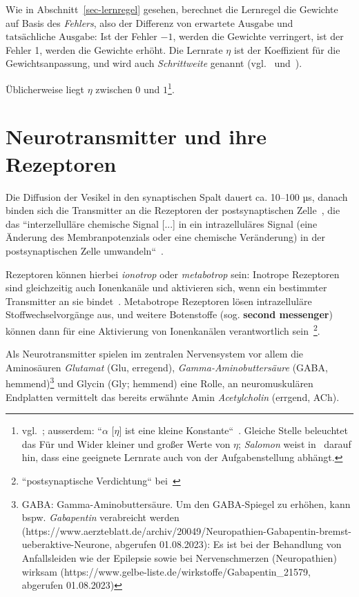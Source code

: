 Wie in Abschnitt~\ref{sec-lernregel} gesehen, berechnet die Lernregel die Gewichte auf Basis des \textit{Fehlers}, also der Differenz von $\text{erwartete Ausgabe}$ und $\text{tatsächliche Ausgabe}$: Ist der Fehler $-1$, werden die Gewichte verringert, ist der Fehler 1, werden die Gewichte erhöht.
Die Lernrate $\eta$ ist der Koeffizient für die Gewichtsanpassung, und wird auch \textit{Schrittweite} genannt (vgl.~\cite[93]{GBC18} und~\cite[172]{RN09}).

Üblicherweise liegt $\eta$ zwischen $0$ und $1$\footnote{
    vgl.~\cite[61]{Fau94}; ausserdem: ``$\alpha$ [$\eta$] ist eine kleine Konstante``~\cite[172]{RN09}. Gleiche Stelle beleuchtet das Für und Wider kleiner und großer Werte von $\eta$; \textit{Salomon} weist in~\cite[173]{Sal90} darauf hin, dass eine geeignete Lernrate auch von der Aufgabenstellung abhängt.
}.



\section{Neurotransmitter und ihre Rezeptoren}

Die Diffusion der Vesikel in den synaptischen Spalt dauert ca. 10–100 µs, danach binden sich die Transmitter an die Rezeptoren der postsynaptischen Zelle~\cite[96]{HS19a}, die das ``interzellulläre chemische Signal [...] in ein intrazelluläres Signal (eine Änderung des Membranpotenzials oder eine chemische Veränderung) in der postsynaptischen Zelle umwandeln``~\cite[123]{BCP18}.

Rezeptoren können hierbei \textit{ionotrop} oder \textit{metabotrop} sein: Inotrope Rezeptoren sind gleichzeitig auch Ionenkanäle und aktivieren sich, wenn ein bestimmter Transmitter an sie bindet~\cite[109]{HS19b}.
Metabotrope Rezeptoren lösen intrazelluläre Stoffwechselvorgänge aus, und weitere Botenstoffe (sog. \textbf{second messenger}) können dann für eine Aktivierung von Ionenkanälen verantwortlich sein~\cite[134]{RK18}\footnote{
    ``postsynaptische Verdichtung`` bei~\cite[123]{BCP18}
}.

Als Neurotransmitter spielen im zentralen Nervensystem vor allem  die Aminosäuren \textit{Glutamat} (Glu, erregend), \textit{Gamma-Aminobuttersäure} (GABA, hemmend)\footnote{
    GABA: Gamma-Aminobuttersäure. Um den GABA-Spiegel zu erhöhen, kann bspw. \textit{Gabapentin} verabreicht werden (https://www.aerzteblatt.de/archiv/20049/Neuropathien-Gabapentin-bremst-ueberaktive-Neurone, abgerufen 01.08.2023): Es ist bei der Behandlung von Anfallsleiden wie der Epilepsie sowie bei Nervenschmerzen (Neuropathien) wirksam (https://www.gelbe-liste.de/wirkstoffe/Gabapentin_21579, abgerufen 01.08.2023)
} und Glycin (Gly; hemmend) eine Rolle, an neuromuskulären Endplatten vermittelt das bereits erwähnte Amin \textit{Acetylcholin} (errgend, ACh).

